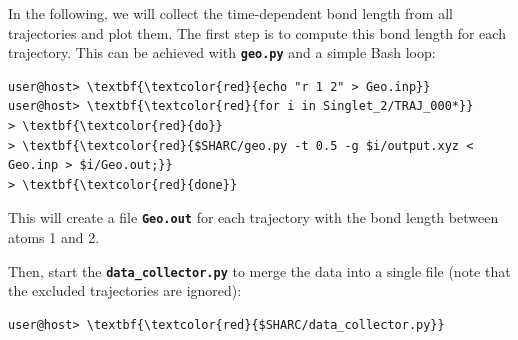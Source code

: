 \documentclass[a4paper,11pt,DIV=15,openany]{scrbook}
\newcommand{\ttt}[1]{\textbf{\texttt{#1}}}
\begin{document}
In the following, we will collect the time-dependent  bond length from all trajectories and plot them.
The first step is to compute this bond length for each trajectory.
This can be achieved with \ttt{geo.py} and a simple Bash loop:
\begin{Verbatim}[commandchars=\\\{\}]
user@host> \textbf{\textcolor{red}{echo "r 1 2" > Geo.inp}}
user@host> \textbf{\textcolor{red}{for i in Singlet_2/TRAJ_000*}}
> \textbf{\textcolor{red}{do}}
> \textbf{\textcolor{red}{$SHARC/geo.py -t 0.5 -g $i/output.xyz < Geo.inp > $i/Geo.out;}}
> \textbf{\textcolor{red}{done}}
\end{Verbatim}
This will create a file \ttt{Geo.out} for each trajectory with the bond length between atoms 1 and 2.

Then, start the \ttt{data\_collector.py} to merge the data into a single file (note that the excluded trajectories are ignored):
\begin{Verbatim}[commandchars=\\\{\}]
user@host> \textbf{\textcolor{red}{$SHARC/data_collector.py}}
\end{Verbatim}
\end{document}
